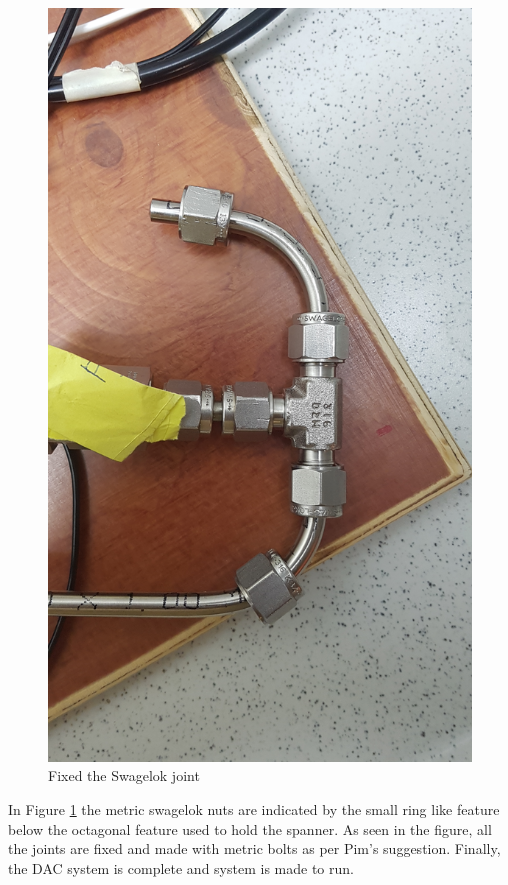 \begin{figure}[H]
    \centering
    \includegraphics[width = \linewidth]{images/mywork/Sprint2/swagelok.jpg}
    \caption{Fixed the Swagelok joint}
    \label{fig:swagiss}
\end{figure}

In Figure \ref{fig:swagiss} the metric swagelok nuts are indicated by the small ring like feature below the octagonal feature used to hold the spanner. As seen in the figure, all the joints are fixed and made with metric bolts as per Pim's suggestion. Finally, the DAC system is complete and system is made to run. 

